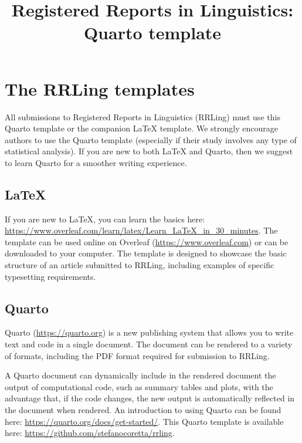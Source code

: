 \documentclass[
]{rrling}
\title{Registered Reports in Linguistics: Quarto template}
\date{}
\begin{document}
\maketitle


\section*{The RRLing templates}\label{the-rrling-templates}

All submissions to Registered Reports in Linguistics (RRLing) must use
this Quarto template or the companion LaTeX template. We strongly
encourage authors to use the Quarto template (especially if their study
involves any type of statistical analysis). If you are new to both LaTeX
and Quarto, then we suggest to learn Quarto for a smoother writing
experience.

\subsection*{LaTeX}\label{latex}

If you are new to LaTeX, you can learn the basics here:
\url{https://www.overleaf.com/learn/latex/Learn_LaTeX_in_30_minutes}.
The template can be used online on Overleaf
(\url{https://www.overleaf.com}) or can be downloaded to your computer.
The template is designed to showcase the basic structure of an article
submitted to RRLing, including examples of specific typesetting
requirements.

\subsection*{Quarto}\label{quarto}

Quarto (\url{https://quarto.org}) is a new publishing system that allows
you to write text and code in a single document. The document can be
rendered to a variety of formats, including the PDF format required for
submission to RRLing.

A Quarto document can dynamically include in the rendered document the
output of computational code, such as summary tables and plots, with the
advantage that, if the code changes, the new output is automatically
reflected in the document when rendered. An introduction to using Quarto
can be found here: \url{https://quarto.org/docs/get-started/}. This
Quarto template is available here:
\url{https://github.com/stefanocoretta/rrling}.
\end{document}
